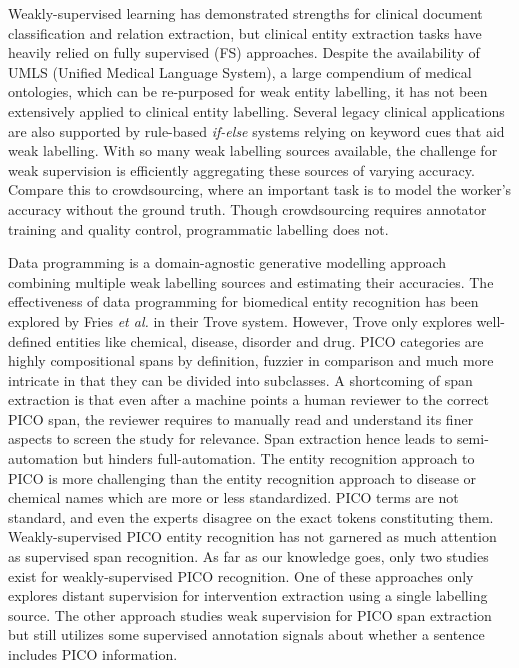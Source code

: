 \documentclass[10.7pt,]{article}
\begin{document}
Weakly-supervised learning has demonstrated strengths for clinical document classification and relation extraction, but clinical entity extraction tasks have heavily relied on fully supervised (FS) approaches.\cite{meng2018weakly,wang2019clinical,mintz2009distant,elangovan2020assigning,weber2020pedl,mallory2020extracting}
Despite the availability of UMLS (Unified Medical Language System), a large compendium of medical ontologies, which can be re-purposed for weak entity labelling, it has not been extensively applied to clinical entity labelling.\cite{humphreys1998unified}
Several legacy clinical applications are also supported by rule-based \textit{if-else} systems relying on keyword cues that aid weak labelling.\cite{friedlin2008software,kim2017extracting,yang2015automatic}
With so many weak labelling sources available, the challenge for weak supervision is efficiently aggregating these sources of varying accuracy.
Compare this to crowdsourcing, where an important task is to model the worker's accuracy without the ground truth.\cite{imamura2018analysis}
Though crowdsourcing requires annotator training and quality control, programmatic labelling does not.\cite{foncubierta2012ground}



Data programming is a domain-agnostic generative modelling approach combining multiple weak labelling sources and estimating their accuracies.
The effectiveness of data programming for biomedical entity recognition has been explored by Fries \textit{et al.} in their Trove system.\cite{fries2021ontology}
However, Trove only explores well-defined entities like chemical, disease, disorder and drug.
PICO categories are highly compositional spans by definition, fuzzier in comparison and much more intricate in that they can be divided into subclasses.
A shortcoming of span extraction is that even after a machine points a human reviewer to the correct PICO span, the reviewer requires to manually read and understand its finer aspects to screen the study for relevance.
Span extraction hence leads to semi-automation but hinders full-automation.
The entity recognition approach to PICO is more challenging than the entity recognition approach to disease or chemical names which are more or less standardized.
PICO terms are not standard, and even the experts disagree on the exact tokens constituting them.\cite{brockmeier2019improving}
Weakly-supervised PICO entity recognition has not garnered as much attention as supervised span recognition.
As far as our knowledge goes, only two studies exist for weakly-supervised PICO recognition.
One of these approaches only explores distant supervision for intervention extraction using a single labelling source.\cite{dhrangadhariya2022distant}
The other approach studies weak supervision for PICO span extraction but still utilizes some supervised annotation signals about whether a sentence includes PICO information.\cite{liu2021sent2span}
\end{document}
